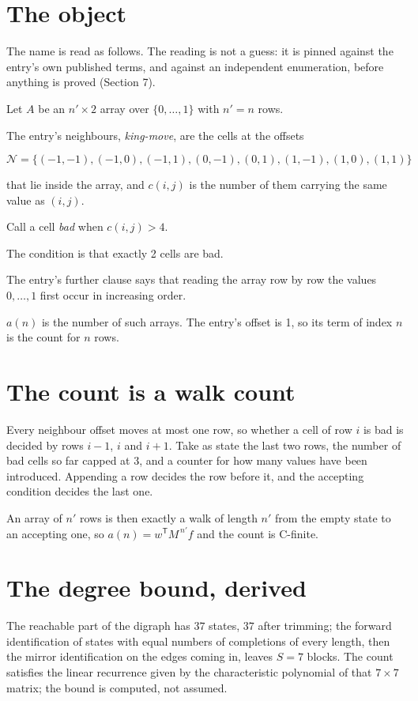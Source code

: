 \documentclass[11pt]{article}
\theoremstyle{definition}
\begin{document}
\section{The object}

The name is read as follows. The reading is not a guess: it is pinned against the entry's own published terms, and against an independent enumeration, before anything is proved (Section 7).

Let $A$ be an $n' \times 2$ array over $\{0,\dots,1\}$ with $n' = n$ rows.

The entry's neighbours, {\itshape king-move}, are the cells at the offsets

\[\mathcal{N} = \{(-1,-1), (-1,0), (-1,1), (0,-1), (0,1), (1,-1), (1,0), (1,1)\}\]

that lie inside the array, and $c(i,j)$ is the number of them carrying the same value as $(i,j)$.

Call a cell {\itshape bad} when $c(i,j) > 4$.

The condition is that exactly 2 cells are bad.

The entry's further clause says that reading the array row by row the values $0,\dots,1$ first occur in increasing order.

$a(n)$ is the number of such arrays. The entry's offset is 1, so its term of index $n$ is the count for $n$ rows.

\section{The count is a walk count}

Every neighbour offset moves at most one row, so whether a cell of row $i$ is bad is decided by rows $i-1$, $i$ and $i+1$. Take as state the last two rows, the number of bad cells so far capped at 3, and a counter for how many values have been introduced. Appending a row decides the row before it, and the accepting condition decides the last one.

An array of $n'$ rows is then exactly a walk of length $n'$ from the empty state to an accepting one, so $a(n) = w^{\mathsf T}M^{\,n'}f$ and the count is C-finite.

\section{The degree bound, derived}

The reachable part of the digraph has $37$ states, $37$ after trimming; the forward identification of states with equal numbers of completions of every length, then the mirror identification on the edges coming in, leaves $S = 7$ blocks. The count satisfies the linear recurrence given by the characteristic polynomial of that $7\times7$ matrix; the bound is computed, not assumed.
\end{document}
